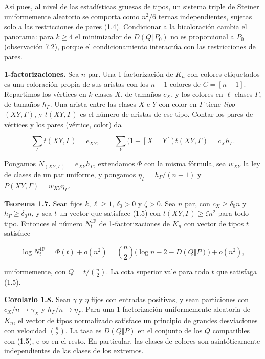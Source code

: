 \documentclass[spanish,11pt,a4paper]{article}
\begin{document}
Así pues, al nivel de las estadísticas gruesas de tipos, un sistema triple de Steiner uniformemente aleatorio se comporta como \(n^2/6\) ternas independientes, sujetas solo a las restricciones de pares (1.4). Condicionar a la bicoloración cambia el panorama: para \(k\ge4\) el minimizador de \(D(Q\Vert P_0)\) no es proporcional a \(P_0\) (observación 7.2), porque el condicionamiento interactúa con las restricciones de pares.

\textbf{1-factorizaciones.} Sea \(n\) par. Una 1-factorización de \(K_n\) con colores etiquetados es una coloración propia de sus aristas con los \(n-1\) colores de \(C=[n-1]\). Repartimos los vértices en \(k\) clases \(X\), de tamaños \(c_X\), y los colores en \(\ell\) clases \(\Gamma\), de tamaños \(h_\Gamma\). Una arista entre las clases \(X\) e \(Y\) con color en \(\Gamma\) tiene \emph{tipo} \((XY,\Gamma)\), y \(t(XY,\Gamma)\) es el número de aristas de ese tipo. Contar los pares de vértices y los pares (vértice, color) da

\nopagebreak[4]
\[\sum_\Gamma t(XY,\Gamma)=e_{XY},\qquad \sum_Y\bigl(1+[X=Y]\bigr)\,t(XY,\Gamma)=c_Xh_\Gamma.\tag{1.5}\]

Pongamos \(N_{(XY,\Gamma)}=e_{XY}h_\Gamma\), extendamos \(\Phi\) con la misma fórmula, sea \(w_{XY}\) la ley de clases de un par uniforme, y pongamos \(\eta_\Gamma=h_\Gamma/(n-1)\) y \(P(XY,\Gamma)=w_{XY}\eta_\Gamma\).

\textbf{Teorema 1.7.} Sean fijos \(k,\ell\ge1\), \(\delta_0>0\) y \(\zeta>0\). Sea \(n\) par, con \(c_X\ge\delta_0 n\) y \(h_\Gamma\ge\delta_0 n\), y sea \(t\) un vector que satisface (1.5) con \(t(XY,\Gamma)\ge\zeta n^2\) para todo tipo. Entonces el número \(N^{1\mathrm F}_t\) de 1-factorizaciones de \(K_n\) con vector de tipos \(t\) satisface

\nopagebreak[4]
\[\log N^{1\mathrm F}_t=\Phi(t)+o(n^2)=\binom n2\bigl(\log n-2-D(Q\Vert P)\bigr)+o(n^2),\]

uniformemente, con \(Q=t/\binom n2\). La cota superior vale para todo \(t\) que satisfaga (1.5).

\textbf{Corolario 1.8.} Sean \(\gamma\) y \(\eta\) fijos con entradas positivas, y sean particiones con \(c_X/n\to\gamma_X\) y \(h_\Gamma/n\to\eta_\Gamma\). Para una 1-factorización uniformemente aleatoria de \(K_n\), el vector de tipos normalizado satisface un principio de grandes desviaciones con velocidad \(\binom n2\). La tasa es \(D(Q\Vert P)\) en el conjunto de los \(Q\) compatibles con (1.5), e \(\infty\) en el resto. En particular, las clases de colores son asintóticamente independientes de las clases de los extremos.
\end{document}
